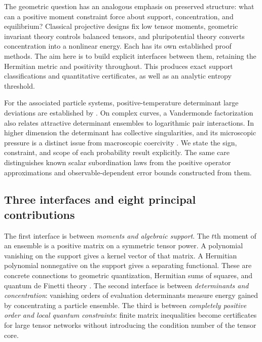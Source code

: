 The geometric question has an analogous emphasis on preserved structure:
what can a positive moment constraint force about support, concentration,
and equilibrium? Classical projective designs fix low tensor moments,
geometric invariant theory controls balanced tensors, and pluripotential
theory converts concentration into a nonlinear energy. Each has its own
established proof methods. The aim here is to build explicit interfaces
between them, retaining the Hermitian metric and positivity throughout.
This produces exact support classifications and quantitative certificates,
as well as an analytic entropy threshold.

For the associated particle systems, positive-temperature determinant
large deviations are established by \citet{prob_berman2017}. On complex
curves, a Vandermonde factorization also relates attractive determinant
ensembles to logarithmic pair interactions. In higher dimension the
determinant has collective singularities, and its microscopic pressure is
a distinct issue from macroscopic coercivity
\citep{AndreassonBermanSvensson2026}. We state the sign, constraint, and
scope of each probability result explicitly. The same care distinguishes
known scalar subordination laws from the positive operator approximations
and observable-dependent error bounds constructed from them.

\subsection{Three interfaces and eight principal contributions}

The first interface is between \emph{moments and algebraic support}.
The $t$th moment of an ensemble is a positive matrix on a symmetric tensor
power. A polynomial vanishing on the support gives a kernel vector of that
matrix. A Hermitian polynomial nonnegative on the support gives a separating
functional. These are concrete connections to geometric quantization,
Hermitian sums of squares, and quantum de Finetti theory
\citep{Rao2024,GouveiaParriloThomas2010}.
The second interface is between \emph{determinants and concentration}:
vanishing orders of evaluation determinants measure energy gained by
concentrating a particle ensemble. The third is between \emph{completely positive
order and local quantum constraints}: finite matrix inequalities become
certificates for large tensor networks without introducing the condition
number of the tensor core.

